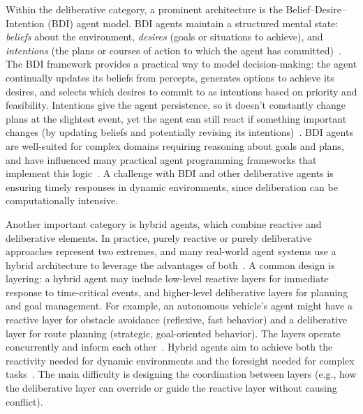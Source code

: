 Within the deliberative category, a prominent architecture is the Belief–Desire–Intention (BDI) agent model. BDI agents maintain a structured mental state: \emph{beliefs} about the environment, \emph{desires} (goals or situations to achieve), and \emph{intentions} (the plans or courses of action to which the agent has committed)~\cite{RaoGeorgeff1995BDI}. The BDI framework provides a practical way to model decision-making: the agent continually updates its beliefs from percepts, generates options to achieve its desires, and selects which desires to commit to as intentions based on priority and feasibility. Intentions give the agent persistence, so it doesn’t constantly change plans at the slightest event, yet the agent can still react if something important changes (by updating beliefs and potentially revising its intentions)~\cite{RaoGeorgeff1995BDI}. BDI agents are well-suited for complex domains requiring reasoning about goals and plans, and have influenced many practical agent programming frameworks that implement this logic~\cite{RaoGeorgeff1995BDI}. A challenge with BDI and other deliberative agents is ensuring timely responses in dynamic environments, since deliberation can be computationally intensive.

Another important category is hybrid agents, which combine reactive and deliberative elements. In practice, purely reactive or purely deliberative approaches represent two extremes, and many real-world agent systems use a hybrid architecture to leverage the advantages of both~\cite{Wooldridge1995IntelligentAgents}. A common design is layering: a hybrid agent may include low-level reactive layers for immediate response to time-critical events, and higher-level deliberative layers for planning and goal management. For example, an autonomous vehicle’s agent might have a reactive layer for obstacle avoidance (reflexive, fast behavior) and a deliberative layer for route planning (strategic, goal-oriented behavior). The layers operate concurrently and inform each other~\cite{Muller1996InteRRaP, Ferguson1996TouringMachines}. Hybrid agents aim to achieve both the reactivity needed for dynamic environments and the foresight needed for complex tasks~\cite{palanca2023flexible, gandon2003combining}. The main difficulty is designing the coordination between layers (e.g., how the deliberative layer can override or guide the reactive layer without causing conflict).

